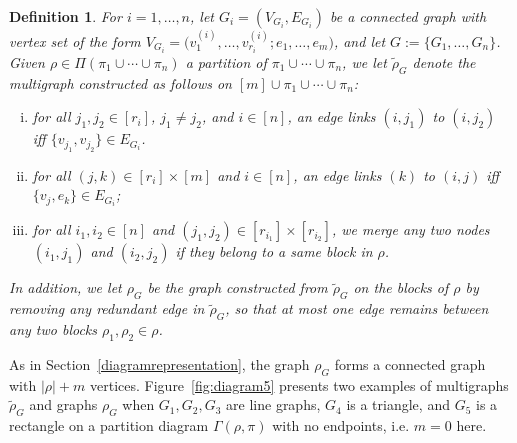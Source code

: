 \documentclass[12pt]{article}
\newtheorem{definition}[prop]{Definition}
\numberwithin{equation}{section}
\begin{document}
\begin{definition}
   \label{fjmklc3} 
 For $i=1,\dots,n$, let $G_i=(V_{G_i},E_{G_i})$
 be a connected graph with vertex set of the form 
 $V_{G_i}=\big(v^{(i)}_1, \ldots ,v^{(i)}_{r_i}; e_1,\ldots , e_m\big)$,
 and let $G:=\{G_1,\ldots , G_n\}$.
 Given $\rho \in\Pi(\pi_1\cup \cdots \cup \pi_n )$
 a partition of $\pi_1\cup \cdots \cup \pi_n $, 
 we let $\widetilde{\rho}_G$ denote the multigraph 
 constructed as follows on $[m] \cup \pi_1\cup \cdots \cup \pi_n$: 
\begin{enumerate}[i)]  
\item for all $j_1, j_2\in [r_i]$, $j_1\not= j_2$, and $i\in [n]$, 
  an edge links $(i,j_1)$ to $(i,j_2)$
  iff $\{v_{j_1},v_{j_2}\}\in E_{G_i}$. 
\item for all $(j,k)\in [r_i]\times [m]$ and $i\in [n]$, an edge
  links $(k)$ to $(i,j)$ iff $\{v_j,e_k\}\in E_{G_i}$; 
\item for all $i_1,i_2\in [n]$ and 
  $(j_1,j_2) \in [r_{i_1}]\times [r_{i_2}]$,
  we merge any two nodes $(i_1,j_1)$ and $(i_2,j_2)$ 
  if they belong to a same block in $\rho$. 
\end{enumerate}
In addition, we let $\rho_G$ be the graph constructed
from $\widetilde{\rho}_G$ on the blocks of $\rho$
by removing any redundant edge
in $\widetilde{\rho}_G$,
  so that at most one edge remains between any two blocks $\rho_1,\rho_2\in\rho$. 
\end{definition}
As in Section~\ref{diagramrepresentation},
 the graph $\rho_G$ forms a connected graph with
 $|\rho | + m$ vertices. 
 Figure~\ref{fig:diagram5} presents two examples of
 multigraphs $\widetilde{\rho}_G$ and graphs $\rho_G$ when $G_1,G_2,G_3$ are line graphs, $G_4$ is a triangle, and $G_5$ is a rectangle 
 on a partition diagram $\Gamma ( \rho , \pi )$ with
 no endpoints, i.e. $m=0$ here.
 
\end{document}
